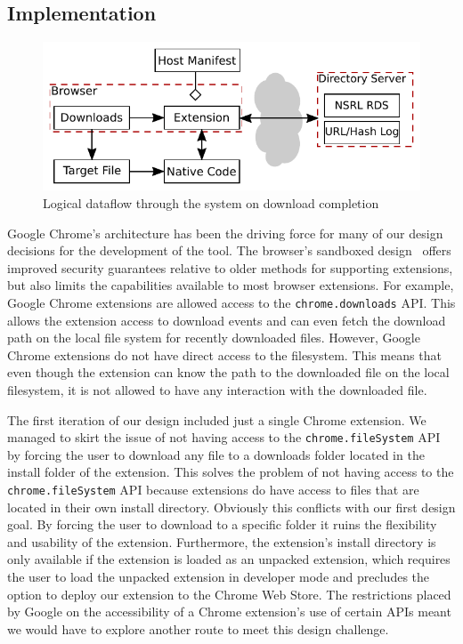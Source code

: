 \documentclass[letterpaper,twocolumn,10pt]{article}
\begin{document}
\subsection{Implementation}

\begin{figure}
    \includegraphics[width=\textwidth]{system.pdf}
    \caption{Logical dataflow through the system on download completion}
    \label{fig:sysflow}
\end{figure}

Google Chrome's architecture has been the driving force for many of our design decisions
for the development of the tool. The browser's sandboxed design~\cite{chromium-security}
offers improved security guarantees relative to older methods for supporting extensions,
but also limits the capabilities available to most browser extensions.
For example, Google Chrome extensions are allowed access to the \texttt{chrome.downloads} API.
This allows the extension access to download events and can even fetch the download path on the
local file system for recently downloaded files. However, Google Chrome extensions do not have
direct access to the filesystem. This means that even though the extension can know
the path to the downloaded file on the local filesystem, it is not allowed to have any interaction with
the downloaded file.

The first iteration of our design included just a single Chrome extension. We managed to skirt the
issue of not having access to the \texttt{chrome.fileSystem} API by forcing the user to download
any file to a downloads folder located in the install folder of the extension. This solves the problem
of not having access to the \texttt{chrome.fileSystem} API because extensions do have access to
files that are located in their own install directory. Obviously this conflicts with our first design goal.
By forcing the user to download to a specific folder it ruins the flexibility and usability of the extension.
Furthermore, the extension’s install directory is only available if the extension is loaded as an unpacked
extension, which requires the user to load the unpacked extension in developer mode and precludes
the option to deploy our extension to the Chrome Web Store. The restrictions placed by Google on
the accessibility of a Chrome extension’s use of certain APIs meant we would have to explore another
route to meet this design challenge.
\end{document}
